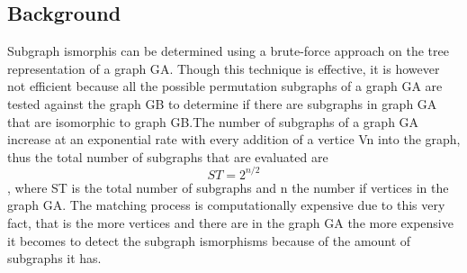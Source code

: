 \label{Ullman Algorithm}




\subsection{Background}
Subgraph ismorphis can be determined using a brute-force approach on the tree representation of a graph G{\tiny A}. Though this technique is effective, it is however not efficient because all the possible
permutation subgraphs of a graph G{\tiny A} are tested against the graph G{\tiny B} to determine if there are subgraphs in graph G{\tiny A} that are isomorphic to graph G{\tiny B}.The number of subgraphs of a graph G{\tiny A} increase at an exponential rate with every addition of a vertice Vn into the graph, thus the total number of subgraphs that are evaluated are  
	\begin{equation}
		ST = 2^{n/2}
	\end{equation} 
, where ST is the total
number of subgraphs and n the number if vertices in the graph G{\tiny A}.
The matching process is computationally expensive due to this very fact, that is the more vertices and there are in the graph G{\tiny A} the more expensive it becomes to detect the subgraph ismorphisms
because of the amount of subgraphs it has.

